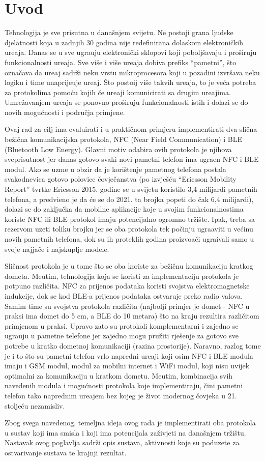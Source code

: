 \chapter{Uvod}

Tehnologija je sve prisutna u dana\v{s}njem svijetu. Ne postoji grana ljudske djelatnosti koja u zadnjih 30 godina nije redefinirana dolaskom elektroni\v{c}kih ure\dj aja. Danas se u sve ugra\dj uju elektroni\v{c}ki sklopovi koji pobolj\v{s}avaju i pro\v{s}iruju funkcionalnosti ure\dj aja. Sve vi\v{s}e i vi\v{s}e ure\dj aja dobiva prefiks ``pametni'', \v{s}to ozna\v{c}ava da ure\dj aj sadr\v{z}i neku vrstu mikroprocesora koji u pozadini izvr\v{s}ava neku logiku i time unaprije\dj uje ure\dj aj. \v{S}to postoij vi\v{s}e takvih ure\dj aja, to je ve\'{c}a potreba za protokolima pomo\'{c}u kojih \'{c}e ure\dj aji komunicirati sa drugim ure\dj ajima. Umre\v{z}avanjem ure\dj aja se ponovno pro\v{s}iruju funkcionalnosti istih i dolazi se do novih mogu\'{c}nosti i podru\v{c}ja primjene.

Ovaj rad za cilj ima evaluirati i u prakti\v{c}nom primjeru implementirati dva sli\v{c}na be\v{z}i\v{c}na komunikacijska protokola, NFC (Near Field Communication) i BLE (Bluetooth Low Energy). Glavni motiv odabira ovih protokola je njihova sveprisutnost jer danas gotovo svaki novi pametni telefon ima ugra\dj en NFC i BLE modul. Ako se uzme u obzir da je kori\v{s}tenje pametnog telefona postala svakodnevica gotovo polovice \v{c}ovje\v{c}anstva (po izvje\v{s}\'{c}u ``Ericsson Mobility Report'' tvrtke Ericsson \cite{mobilityReport} 2015. godine se u svijetu koristilo 3,4 milijardi pametnih telefona, a predvi\dj eno je da \'{c}e se do 2021. ta brojka popeti do \v{c}ak 6,4 milijardi), dolazi se do zaklju\v{c}ka da mobilne aplikacije koje u svojim funkcionalnostima koriste NFC ili BLE protokol imaju potencijalno ogromno tr\v{z}i\v{s}te. Ipak, treba sa rezervom uzeti toliku brojku jer se oba protokola tek po\v{c}inju ugra\dj aviti u ve\'{c}inu novih pametnih telefona, dok su ih proteklih godina proizvo\dj a\v{c}i ugra\dj ivali samo u svoje najja\v{c}e i najskuplje modele.

Sli\v{c}nost protokola je u tome \v{s}to se oba koriste za be\v{z}i\v{c}nu komunikaciju kratkog dometa. Me\dj utim, tehnologija koja se koristi za implementaciju protokola je potpuno razli\v{c}ita. NFC za prijenos podataka koristi svojstva elektromagnetske indukcije, dok se kod BLE-a prijenos podataka ostvaruje preko radio valova. Samim time su svojstva protokola razli\v{c}ita (najbolji primjer je domet - NFC u praksi ima domet do 5 cm, a BLE do 10 metara) \v{s}to na kraju rezultira razli\v{c}itom primjenom u praksi. Upravo zato su protokoli komplementarni i zajedno se ugra\dj uju u pametne telefone jer zajedno mogu pru\v{z}iti rje\v{s}enje za gotovo sve potrebe u kratko dometnoj komunikaciji (razina prostorije). Naravno, razlog tome je i to \v{s}to su pametni telefon vrlo napredni ure\dj aji koji osim NFC i BLE modula imaju i GSM modul, modul za mobilni internet i WiFi modul, koji nisu uvijek optimalni za komunikaciju u kratkom dometu. Me\dj utim, kombinacija svih navedenih modula i mogu\'{c}nosti protokola koje implementiraju, \v{c}ini pametni telefon tako naprednim ure\dj ajem bez kojeg je \v{z}ivot modernog \v{c}ovjeka u 21. stolje\'{c}u nezamisliv.

Zbog svega navedenog, temeljna ideja ovog rada je implementirati oba protokola u sustav koji ima smisla i koji ima potencijala za\v{z}ivjeti na dana\v{s}njem tr\v{z}i\v{s}tu. Nastavak ovog poglavlja sadr\v{z}i opis sustava, aktivnosti koje su poduzete za ostvarivanje sustava te krajnji rezultat.
